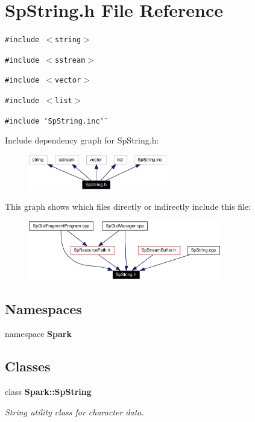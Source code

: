 \section{Sp\-String.h File Reference}
\label{SpString_8h}
{\tt \#include $<$string$>$}\par
{\tt \#include $<$sstream$>$}\par
{\tt \#include $<$vector$>$}\par
{\tt \#include $<$list$>$}\par
{\tt \#include \char`\"{}Sp\-String.inc\char`\"{}}\par


Include dependency graph for Sp\-String.h:\begin{figure}[H]
\begin{center}
\leavevmode
\includegraphics[width=171pt]{SpString_8h__incl}
\end{center}
\end{figure}


This graph shows which files directly or indirectly include this file:\begin{figure}[H]
\begin{center}
\leavevmode
\includegraphics[width=238pt]{SpString_8h__dep__incl}
\end{center}
\end{figure}
\subsection*{Namespaces}
\begin{CompactItemize}
\item 
namespace {\bf Spark}
\end{CompactItemize}
\subsection*{Classes}
\begin{CompactItemize}
\item 
class {\bf Spark::Sp\-String}
\begin{CompactList}\small\item\em String utility class for character data. \item\end{CompactList}\end{CompactItemize}
